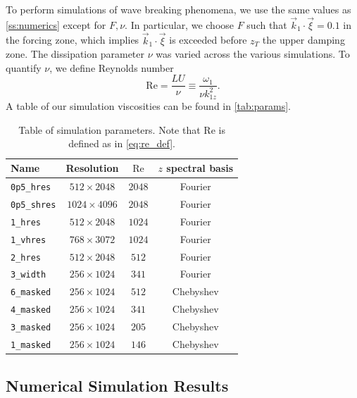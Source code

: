 \documentclass[
        fleqn,
        usenatbib,
    ]{mnras}
\begin{document}
To perform simulations of wave breaking phenomena, we use the same values as
\autoref{ss:numerics} except for $F, \nu$. In particular, we choose $F$ such
that $\vec{k}_1 \cdot \vec{\xi} = 0.1$ in the forcing zone, which implies
$\vec{k}_1 \cdot \vec{\xi}$ is exceeded before $z_T$ the upper damping zone.
The dissipation parameter $\nu$ was varied across the various simulations. To
quantify $\nu$, we define Reynolds number
\begin{equation}
    \mathrm{Re} = \frac{LU}{\nu} \equiv \frac{\omega_1}{\nu k_{1z}^2}.
        \label{eq:re_def}
\end{equation}
A table of our simulation viscosities can be found in \autoref{tab:params}.
\begin{table}
    \centering
    \begin{tabular}{l c c c}
        Name & Resolution & $\mathrm{Re}$ & $z$ spectral basis\\\bottomrule
        \texttt{0p5\_hres} & $512 \times 2048$ & $2048$ & Fourier\\
        \texttt{0p5\_shres} & $1024 \times 4096$ & $2048$ & Fourier\\
        \texttt{1\_hres} & $512 \times 2048$ & $1024$ & Fourier\\
        \texttt{1\_vhres} & $768 \times 3072$ & $1024$ & Fourier\\
        \texttt{2\_hres} & $512 \times 2048$ & $512$ & Fourier\\
        \texttt{3\_width} & $256 \times 1024$ & $341$ & Fourier\\
        \texttt{6\_masked} & $256 \times 1024$ & $512$ & Chebyshev\\
        \texttt{4\_masked} & $256 \times 1024$ & $341$ & Chebyshev\\
        \texttt{3\_masked} & $256 \times 1024$ & $205$ & Chebyshev\\
        \texttt{1\_masked} & $256 \times 1024$ & $146$ & Chebyshev\\
    \end{tabular}
    \caption{Table of simulation parameters. Note that $\mathrm{Re}$ is defined
    as in \autoref{eq:re_def}.}\label{tab:params}
\end{table}

\subsection{Numerical Simulation Results}\label{ss:nl_ns}
\end{document}
